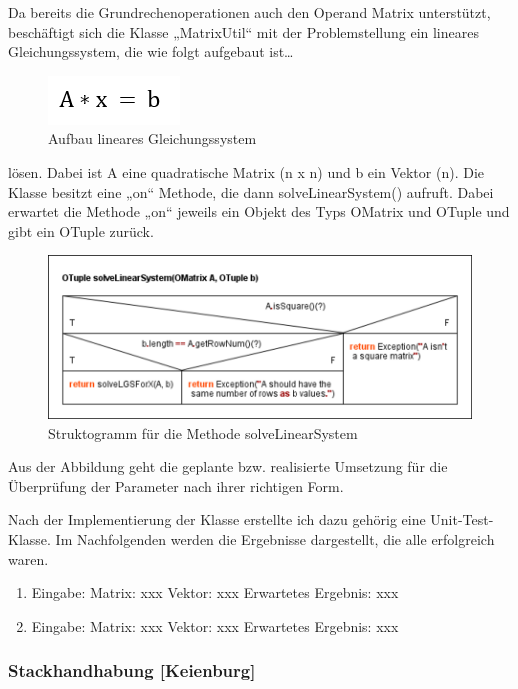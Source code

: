 Da bereits die Grundrechenoperationen auch den Operand Matrix unterstützt, beschäftigt sich die Klasse „MatrixUtil“ mit der Problemstellung ein lineares Gleichungssystem, die wie folgt aufgebaut ist…

\begin{figure}[h]
	\includegraphics[scale=1]{img/gleichungssystem-loesen}
	\caption[Aufbau lineares Gleichungssystem]{Aufbau lineares Gleichungssystem\footnotemark}
\end{figure}

lösen. Dabei ist A eine quadratische Matrix (n x n) und b ein Vektor (n).
Die Klasse besitzt eine „on“ Methode, die dann solveLinearSystem() aufruft. Dabei erwartet die Methode „on“ jeweils ein Objekt des Typs OMatrix und OTuple und gibt ein OTuple zurück. 

\begin{figure}[h]
	\includegraphics[width=\columnwidth]{img/solveLinearSystem}
	\caption[Struktogramm für die Methode solveLinearSystem]{Struktogramm für die Methode solveLinearSystem\footnotemark}
\end{figure}

Aus der Abbildung geht die geplante bzw. realisierte Umsetzung für die Überprüfung der Parameter nach ihrer richtigen Form. 

Nach der Implementierung der Klasse erstellte ich dazu gehörig eine Unit-Test-Klasse. Im Nachfolgenden werden die Ergebnisse dargestellt, die alle erfolgreich waren. 
\begin{enumerate}
	\item Eingabe: Matrix: xxx  Vektor: xxx Erwartetes Ergebnis: xxx
	\item Eingabe: Matrix: xxx Vektor: xxx Erwartetes Ergebnis: xxx
\end{enumerate}


\subsubsection{Stackhandhabung [Keienburg]}


